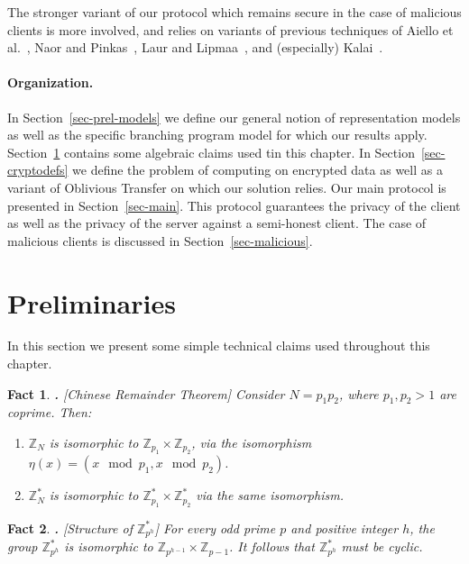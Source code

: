 \documentclass[11pt]{article}
\newcommand{\Z}{{\mathbb{Z}}}
\newtheorem{FACT}{Fact}[section]
\newenvironment{fact}{\begin{FACT} \hspace{-.85em} {\bf .} \rm}%
	{\end{FACT}}
\newcommand{\U}[1]{\mathbb{Z}_{#1}^*}
\begin{document}
The stronger variant of our protocol which remains secure in the
case of malicious clients is more involved, and relies on variants
of previous techniques of Aiello et al.~\cite{AIR01}, Naor and
Pinkas~\cite{NP01}, Laur and Lipmaa~\cite{L05}, and (especially)
Kalai~\cite{T05}.


\paragraph{Organization.} In Section~\ref{sec-prel-models} we define our
general notion of representation models as well as the specific
branching program model for which our results apply. Section~\ref{sec-bp-prelims} contains
some algebraic claims used tin this chapter.
In Section~\ref{sec-cryptodefs} we define the problem of computing on
encrypted data as well as a variant of Oblivious Transfer on which
our solution relies. Our main protocol is presented in
Section~\ref{sec-main}. This protocol guarantees the privacy of the
client as well as the privacy of the server against a semi-honest
client. The case of malicious clients is discussed in
Section~\ref{sec-malicious}.

\section{Preliminaries}\label{sec-bp-prelims}
In this section we present some simple technical claims used throughout this chapter.

\begin{fact}[Chinese Remainder Theorem]
  \label{fact-crt} Consider $N=p_1p_2$, where $p_1,p_2>1$ are
  coprime. Then:
  \begin{enumerate}
    \item $\Z_N$ is isomorphic to $\Z_{p_1}\times\Z_{p_2}$,
    via the isomorphism $\eta(x)=(x\mod p_1,x\mod p_2)$.
    \item $\U{N}$ is isomorphic to $\U{p_1}\times\U{p_2}$ via the same
    isomorphism.
  \end{enumerate}
\end{fact}

\begin{fact}[Structure of $\U{p^h}$]
  \label{fact-zp-cyc} For every odd prime $p$ and positive integer
  $h$, the group $\U{p^h}$ is isomorphic to
  $\Z_{p^{h-1}}\times\Z_{p-1}$. It follows that $\U{p^h}$ must be
  cyclic.
\end{fact}
\end{document}
